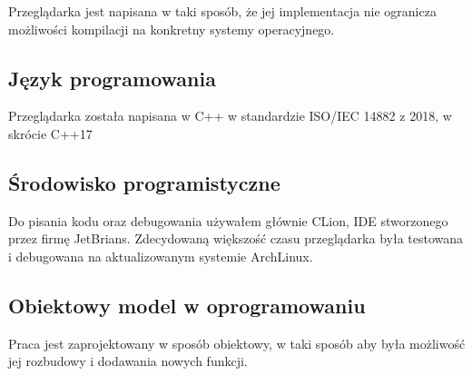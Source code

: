 Przeglądarka jest napisana w taki sposób, że jej implementacja nie ogranicza możliwości kompilacji na konkretny systemy operacyjnego.


\subsection{Język programowania}

Przeglądarka została napisana w C++ w standardzie ISO/IEC 14882 z 2018, w skrócie C++17

\subsection{Środowisko programistyczne}

Do pisania kodu oraz debugowania używałem głównie CLion, IDE stworzonego przez firmę JetBrians.
Zdecydowaną większość czasu przeglądarka była testowana i debugowana na aktualizowanym systemie ArchLinux.

\subsection{Obiektowy model w oprogramowaniu}

Praca jest zaprojektowany w sposób obiektowy, w taki sposób aby była możliwość jej rozbudowy i dodawania nowych funkcji.